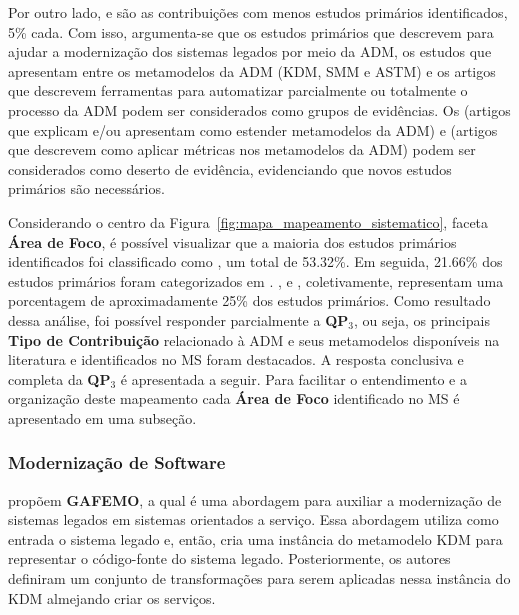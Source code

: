 Por outro lado,  e  são as contribuições com menos estudos primários identificados, 5\% cada. Com isso, argumenta-se que os estudos primários que descrevem  para ajudar a modernização dos sistemas legados por meio da ADM, os estudos que apresentam  entre os metamodelos da ADM (KDM, SMM e ASTM) e os artigos que descrevem ferramentas para automatizar parcialmente ou totalmente o processo da ADM podem ser considerados como grupos de evidências. Os  (artigos que explicam e/ou apresentam como estender metamodelos da ADM) e  (artigos que descrevem como aplicar métricas nos metamodelos da ADM) podem ser considerados como deserto de evidência, evidenciando que novos estudos primários são necessários.

Considerando o centro da Figura~\ref{fig:mapa_mapeamento_sistematico}, faceta \textbf{Área de Foco}, é possível visualizar que a maioria dos estudos primários identificados foi classificado como , um total de 53.32\%. Em seguida, 21.66\% dos estudos primários foram categorizados em . ,  e , coletivamente, representam uma porcentagem de aproximadamente 25\% dos estudos primários. Como resultado dessa análise, foi possível responder parcialmente a \textbf{QP$_3$}, ou seja, os principais \textbf{Tipo de Contribuição} relacionado à ADM e seus metamodelos disponíveis na literatura e identificados no MS foram destacados. A resposta conclusiva e completa da \textbf{QP$_3$} é apresentada a seguir. Para facilitar o entendimento e a organização deste mapeamento cada \textbf{Área de Foco} identificado no MS é apresentado em uma subseção.


\subsubsection{Modernização de Software} %
\label{ssub:approach}

 propõem \textbf{GAFEMO}, a qual é uma abordagem para auxiliar a modernização de sistemas legados em sistemas orientados a serviço. Essa abordagem utiliza como entrada o sistema legado e, então, cria uma instância do metamodelo KDM para representar o código-fonte do sistema legado. Posteriormente, os autores definiram um conjunto de transformações para serem aplicadas nessa instância do KDM almejando criar os serviços.


